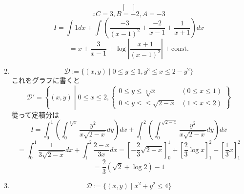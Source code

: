 \documentclass[a4paper,10pt,report]{amsart}
\theoremstyle{plain}
\theoremstyle{definition}
\theoremstyle{remark}
\begin{document}
\begin{enumerate}
\begin{equation*}
\begin{bmatrix}
            \end{bmatrix}
        \end{equation*}
        \begin{equation*}
            \therefore C=3,B=-2,A=-3
        \end{equation*}
        \begin{equation*}
            I=\int1dx+\int\left(\frac{-3}{{(x-1)}^{2}}+\frac{-2}{x-1}+\frac{1}{x+1}\right)dx
        \end{equation*}
        \begin{equation*}
            =x+\frac{3}{x-1}+\log\left|\frac{x+1}{{(x-1)}^{2}}\right|+\mathrm{const.}
        \end{equation*}
        \item
        \begin{equation*}
            \mathcal{D}:=\{(x,y)\mid0\leq y\leq 1,y^{3}\leq x\leq 2-y^{2}\}
        \end{equation*}
        これをグラフに書くと
        \begin{equation*}
            \mathcal{D}'=\left \{(x,y)\middle|0\leq x\leq 2,
            \begin{cases}
                0\leq y\leq \sqrt[3]{x}&(0\leq x\leq 1) \\
                0\leq y\leq \leq \sqrt{2-x}&(1\leq x\leq 2)
            \end{cases}
            \right \}
        \end{equation*}
        從って定積分は
        \begin{equation*}
            I=\int_{0}^{1}\left(\int_{0}^{\sqrt[3]{x}}\frac{y^{2}}{x\sqrt{2-x}}dy\right)dx+\int_{1}^{2}\left(\int_{0}^{\sqrt{2-x}}\frac{y^{2}}{x\sqrt{2-x}}dy\right)dx
        \end{equation*}
        \begin{equation*}
            =\int_{0}^{1}\frac{1}{3\sqrt{2-x}}dx+\int_{1}^{2}\frac{2-x}{3x}dx={\left[-\frac{2}{3}\sqrt{2-x}\right]}_{0}^{1}+{\left[\frac{2}{3}\log{}x\right]}_{1}^{2}-{\left[\frac{1}{3}x\right]}_{1}^{2}
        \end{equation*}
        \begin{equation*}
            =\frac{2}{3}(\sqrt{2}+\log{2})-1
        \end{equation*}
        \item 
        \begin{equation*}
            \mathcal{D}:=\{(x,y)\mid{}x^{2}+y^{2}\leq4\}
        \end{equation*}
        \begin{equation*}

\end{equation*}
\end{enumerate}
\end{document}
